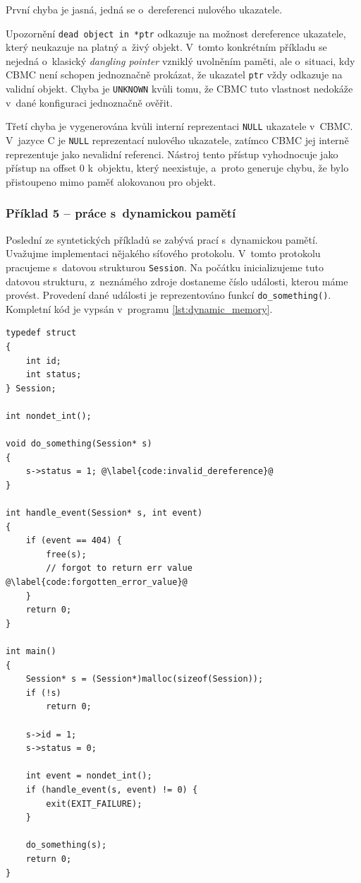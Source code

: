 \documentclass[a4paper, 11pt]{article}
\begin{document}
\noindent První chyba je jasná, jedná se o~dereferenci nulového ukazatele.

Upozornění \texttt{dead object in *ptr} odkazuje na možnost dereference ukazatele, který neukazuje na platný a~živý objekt.
V~tomto konkrétním příkladu se nejedná o~klasický \emph{dangling pointer} vzniklý uvolněním paměti, ale o~situaci, kdy CBMC není schopen jednoznačně prokázat, že ukazatel \texttt{ptr} vždy odkazuje na validní objekt.
Chyba je \texttt{UNKNOWN} kvůli tomu, že CBMC tuto vlastnost nedokáže v~dané konfiguraci jednoznačně ověřit.



Třetí chyba je vygenerována kvůli interní reprezentaci \texttt{NULL} ukazatele v~CBMC.
V~jazyce C je \texttt{NULL} reprezentací nulového ukazatele, zatímco CBMC jej interně reprezentuje jako nevalidní referenci.
Nástroj tento přístup vyhodnocuje jako přístup na offset 0 k~objektu, který neexistuje, a~proto generuje chybu, že bylo přistoupeno mimo paměť alokovanou pro objekt.

\subsubsection{Příklad 5 -- práce s~dynamickou pamětí}

Poslední ze syntetických příkladů se zabývá prací s~dynamickou pamětí.
Uvažujme implementaci nějakého síťového protokolu.
V~tomto protokolu pracujeme s~datovou strukturou \texttt{Session}.
Na počátku inicializujeme tuto datovou strukturu, z~neznámého zdroje dostaneme číslo události, kterou máme provést.
Provedení dané události je reprezentováno funkcí \texttt{do\_something()}.
Kompletní kód je vypsán v~programu \ref{lst:dynamic_memory}.

\begin{listing}[ht]
    \caption{Ukázka chyby \emph{use-after-free} při práci s~dynamickou pamětí.}
    \label{lst:dynamic_memory}
    \begin{verbatim}
typedef struct
{
    int id;
    int status;
} Session;

int nondet_int();

void do_something(Session* s) 
{
    s->status = 1; @\label{code:invalid_dereference}@
}

int handle_event(Session* s, int event)
{
    if (event == 404) {
        free(s);
        // forgot to return err value @\label{code:forgotten_error_value}@
    }
    return 0;
}

int main()
{
    Session* s = (Session*)malloc(sizeof(Session));
    if (!s)
        return 0;

    s->id = 1;
    s->status = 0;

    int event = nondet_int();
    if (handle_event(s, event) != 0) {
        exit(EXIT_FAILURE);
    }

    do_something(s);
    return 0;
}
    \end{verbatim}
\end{listing}
\end{document}
